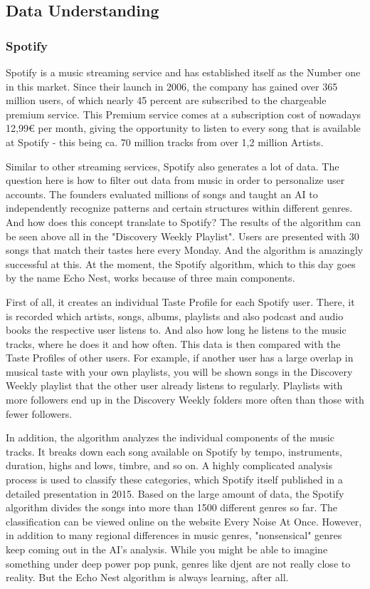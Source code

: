 \subsection{Data Understanding}
\subsubsection{Spotify}
Spotify is a music streaming service and has established itself as the Number one in this market. 
Since their launch in 2006, the company has gained over 365 million users, of which nearly 45 percent
are subscribed to the chargeable premium service. 
This Premium service comes at a subscription cost of nowadays 12,99€ per month,
giving the opportunity to listen to every song that is available at Spotify - this being
ca. 70 million tracks from over 1,2 million Artists.

Similar to other streaming services, Spotify also generates a lot of data.
The question here is how to filter out data from music in order to personalize user accounts. 
The founders evaluated millions of songs and taught an AI to independently recognize
patterns and certain structures within different genres. 
And how does this concept translate to Spotify?
The results of the algorithm can be seen above all in the "Discovery Weekly Playlist". 
Users are presented with 30 songs that match their tastes here every Monday.
And the algorithm is amazingly successful at this. 
At the moment, the Spotify algorithm, which to this day goes by the name Echo Nest,
works because of three main components. 

First of all, it creates an individual Taste Profile for each Spotify user. 
There, it is recorded which artists, songs, albums, playlists and also podcast and audio books the
respective user listens to. 
And also how long he listens to the music tracks, where he does it and how often.
This data is then compared with the Taste Profiles of other users. 
For example, if another user has a large overlap in musical taste with your own playlists,
you will be shown songs in the Discovery Weekly playlist that the other user already listens to regularly.
Playlists with more followers end up in the Discovery Weekly folders more often than those with
fewer followers. 

In addition, the algorithm analyzes the individual components of the music tracks. 
It breaks down each song available on Spotify by tempo, instruments, duration, highs and lows,
timbre, and so on. 
A highly complicated analysis process is used to classify these categories,
which Spotify itself published in a detailed presentation in 2015. 
Based on the large amount of data, the Spotify algorithm divides the songs into more than 1500
different genres so far. 
The classification can be viewed online on the website Every Noise At Once.
However, in addition to many regional differences in music genres, "nonsensical" genres keep
coming out in the AI's analysis. While you might be able to imagine something under deep power pop punk,
genres like djent are not really close to reality. 
But the Echo Nest algorithm is always learning, after all. 

